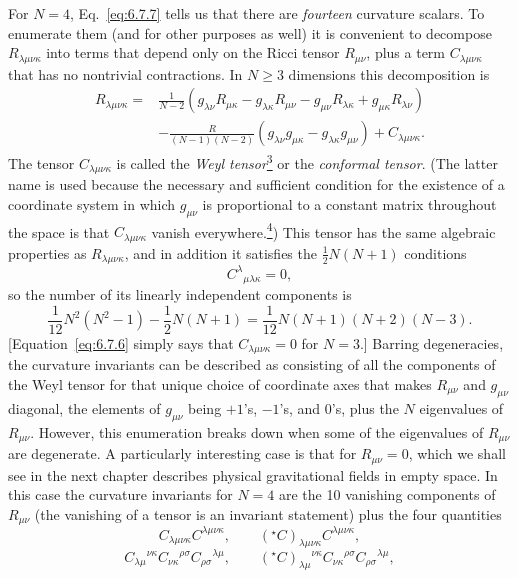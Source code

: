For \(N=4\), Eq.~\eqref{eq:6.7.7} tells us that there are \emph{fourteen}
curvature scalars. To enumerate them (and for other purposes as well) it is
convenient to decompose \(R_{\lambda\mu\nu\kappa}\) into terms that depend
only on the Ricci tensor \(R_{\mu\nu}\), plus a term
\(C_{\lambda\mu\nu\kappa}\) that has no nontrivial contractions. In
\(N\geq3\) dimensions this decomposition is
\begin{align*}
  R_{\lambda\mu\nu\kappa}
  ={}&
  \frac1{N-2}
  \left(
    g_{\lambda\nu}R_{\mu\kappa}
    -g_{\lambda\kappa}R_{\mu\nu}
    -g_{\mu\nu}R_{\lambda\kappa}
    +g_{\mu\kappa}R_{\lambda\nu}
  \right)
  \\
  &-
  \frac{R}{(N-1)(N-2)}
  (g_{\lambda\nu}g_{\mu\kappa}
   -g_{\lambda\kappa}g_{\mu\nu})
  +C_{\lambda\mu\nu\kappa}.
\end{align*}
The tensor \(C_{\lambda\mu\nu\kappa}\) is called the \emph{Weyl
tensor}\hyperref[ch6-ref-3]{\textsuperscript{3}} or the \emph{conformal
tensor}. (The latter name is used because the necessary and sufficient
condition for the existence of a coordinate system in which \(g_{\mu\nu}\)
is proportional to a constant matrix throughout the space is that
\(C_{\lambda\mu\nu\kappa}\) vanish
everywhere.\hyperref[ch6-ref-4]{\textsuperscript{4}}) This tensor has the same
algebraic properties as \(R_{\lambda\mu\nu\kappa}\), and in addition it
satisfies the \(\tfrac12N(N+1)\) conditions
\[
  C^\lambda{}_{\mu\lambda\kappa}=0,
\]
so the number of its linearly independent components is
\[
  \frac1{12}N^2(N^2-1)-\frac12N(N+1)
  =
  \frac1{12}N(N+1)(N+2)(N-3).
\]
[Equation~\eqref{eq:6.7.6} simply says that
\(C_{\lambda\mu\nu\kappa}=0\) for \(N=3\).] Barring degeneracies, the
curvature invariants can be described as consisting of all the components of
the Weyl tensor for that unique choice of coordinate axes that makes
\(R_{\mu\nu}\) and \(g_{\mu\nu}\) diagonal, the elements of \(g_{\mu\nu}\)
being \(+1\)'s, \(-1\)'s, and \(0\)'s, plus the \(N\) eigenvalues of
\(R_{\mu\nu}\). However, this enumeration breaks down when some of the
eigenvalues of \(R_{\mu\nu}\) are degenerate. A particularly interesting case
is that for \(R_{\mu\nu}=0\), which we shall see in the next chapter describes
physical gravitational fields in empty space. In this case the curvature
invariants for \(N=4\) are the 10 vanishing components of \(R_{\mu\nu}\) (the
vanishing of a tensor is an invariant statement) plus the four quantities
\[
  C_{\lambda\mu\nu\kappa}C^{\lambda\mu\nu\kappa},
  \qquad
  ({}^\star C)_{\lambda\mu\nu\kappa}C^{\lambda\mu\nu\kappa},
\]
\[
  C_{\lambda\mu}{}^{\nu\kappa}
  C_{\nu\kappa}{}^{\rho\sigma}
  C_{\rho\sigma}{}^{\lambda\mu},
  \qquad
  ({}^\star C)_{\lambda\mu}{}^{\nu\kappa}
  C_{\nu\kappa}{}^{\rho\sigma}
  C_{\rho\sigma}{}^{\lambda\mu},
\]
